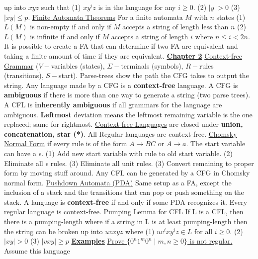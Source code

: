 \documentclass[9pt]{article}
\begin{document}
up into $xyz$ such that (1) $xy^iz$ is in the language for any $i\geq 0$. (2) $|y|>0$
(3) $|xy| \leq p$.\newline
\uline{Finite Automata Theorems} For a finite automata $M$ with $n$ states (1) $L(M)$ 
is non-empty if and only if $M$ accepts a string of length less than $n$ (2) $L(M)$ is 
infinite if and only if $M$ accepts a string of length $i$ where $n\leq i < 2n$. It is
possible to create a FA that can determine if two FA are equivalent and taking a 
finite amount of time if they are equivalent.\newline
\noindent\uline{\textbf{Chapter 2}}\newline
\uline{Context-free Grammar} ($V-$variables (states), $\Sigma-$terminals (symbols), 
$R-$rules (transitions), $S-$start). Parse-trees show the path the CFG takes to output
the string. Any language made by a CFG is a \textbf{context-free} language. A CFG is
\textbf{ambiguous} if there is more than one way to generate a string (two parse trees). 
A CFL is \textbf{inherently ambiguous} if all grammars for the language are ambiguous. 
\textbf{Leftmost} deviation means the leftmost remaining variable is the one replaced; 
same for rightmost.\newline
\uline{Context-free Languages} are closed under \textbf{union, concatenation, star (*)}. 
All Regular languages are context-free.\newline
\uline{Chomsky Normal Form} if every rule is of the form $A\rightarrow BC$ or 
$A\rightarrow a$. The start variable can have a $\epsilon$. (1) Add new start variable 
with rule to old start variable. (2) Eliminate all $\epsilon$ rules. (3) Eliminate all
unit rules. (3) Convert remaining to proper form by moving stuff around. Any CFL can be 
generated by a CFG in Chomsky normal form.\newline
\uline{Pushdown Automata (PDA)} Same setup as a FA, except the inclusion of a stack
and the transitions that can pop or push something on the stack. A language is 
\textbf{context-free} if and only if some PDA recognizes it. Every regular language is
context-free.\newline
\uline{Pumping Lemma for CFL} If L is a CFL, then there is a pumping-length where if
a string in L is at least pumping-length then the string can be broken up into $uvxyz$
where (1) $uv^ixy^iz \in L$ for all $i\geq 0$. (2) $|xy|>0$ (3) $|vxy|\geq p$\newline
\uline{\textbf{Examples}}\newline
\uline{Prove $\{0^n1^m0^n \mid m,n \geq 0\}$ is not regular.} Assume this language 
\end{document}
